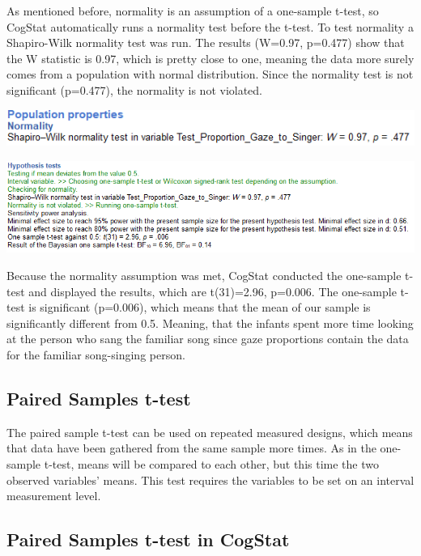 \documentclass[
]{book}
\begin{document}
As mentioned before, normality is an assumption of a one-sample t-test, so CogStat automatically runs a normality test before the t-test. To test normality a Shapiro-Wilk normality test was run. The results (W=0.97, p=0.477) show that the W statistic is 0.97, which is pretty close to one, meaning the data more surely comes from a population with normal distribution. Since the normality test is not significant (p=0.477), the normality is not violated.

\includegraphics{img/ch6/6.5poppropSW.png}

\includegraphics{img/ch6/6.5hyptest.png}

Because the normality assumption was met, CogStat conducted the one-sample t-test and displayed the results, which are t(31)=2.96, p=0.006. The one-sample t-test is significant (p=0.006), which means that the mean of our sample is significantly different from 0.5. Meaning, that the infants spent more time looking at the person who sang the familiar song since gaze proportions contain the data for the familiar song-singing person.

\hypertarget{paired-samples-t-test-1}{%
\subsection{Paired Samples t-test}\label{paired-samples-t-test-1}}

The paired sample t-test can be used on repeated measured designs, which means that data have been gathered from the same sample more times. As in the one-sample t-test, means will be compared to each other, but this time the two observed variables' means. This test requires the variables to be set on an interval measurement level.

\hypertarget{paired-samples-t-test-in-cogstat}{%
\subsection{Paired Samples t-test in CogStat}\label{paired-samples-t-test-in-cogstat}}
\end{document}
